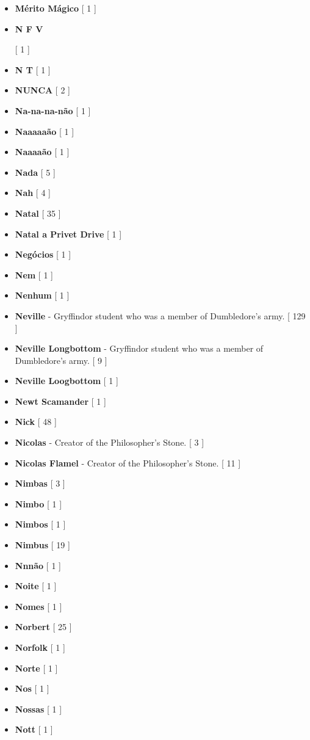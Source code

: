 \documentclass[a4paper]{article}
\begin{document}
\begin{itemize}
	\item \textbf{Mérito Mágico} [ 1 ]
	\item \hypertarget{N}{\textbf{N F V}} [ 1 ]
	\item \textbf{N T} [ 1 ]
	\item \textbf{NUNCA} [ 2 ]
	\item \textbf{Na-na-na-não} [ 1 ]
	\item \textbf{Naaaaaão} [ 1 ]
	\item \textbf{Naaaaão} [ 1 ]
	\item \textbf{Nada} [ 5 ]
	\item \textbf{Nah} [ 4 ]
	\item \textbf{Natal} [ 35 ]
	\item \textbf{Natal a Privet Drive} [ 1 ]
	\item \textbf{Negócios} [ 1 ]
	\item \textbf{Nem} [ 1 ]
	\item \textbf{Nenhum} [ 1 ]
	\item \textbf{Neville} - Gryffindor student who was a member of Dumbledore's army. [ 129 ]
	\item \textbf{Neville Longbottom} - Gryffindor student who was a member of Dumbledore's army. [ 9 ]
	\item \textbf{Neville Loogbottom} [ 1 ]
	\item \textbf{Newt Scamander} [ 1 ]
	\item \textbf{Nick} [ 48 ]
	\item \textbf{Nicolas} - Creator of the Philosopher's Stone. [ 3 ]
	\item \textbf{Nicolas Flamel} - Creator of the Philosopher's Stone. [ 11 ]
	\item \textbf{Nimbas} [ 3 ]
	\item \textbf{Nimbo} [ 1 ]
	\item \textbf{Nimbos} [ 1 ]
	\item \textbf{Nimbus} [ 19 ]
	\item \textbf{Nnnão} [ 1 ]
	\item \textbf{Noite} [ 1 ]
	\item \textbf{Nomes} [ 1 ]
	\item \textbf{Norbert} [ 25 ]
	\item \textbf{Norfolk} [ 1 ]
	\item \textbf{Norte} [ 1 ]
	\item \textbf{Nos} [ 1 ]
	\item \textbf{Nossas} [ 1 ]
	\item \textbf{Nott} [ 1 ]

\end{itemize}
\end{document}
